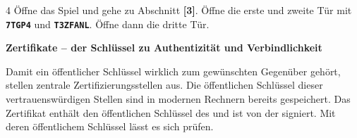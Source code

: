 \documentclass[11pt,a4paper]{article}
\begin{document}
\begin{aufgabe}{4}
Öffne das Spiel und gehe zu Abschnitt \textbf{[3]}. Öffne die erste und zweite Tür mit \texttt{\bfseries 7TGP4} und \texttt{\bfseries T3ZFANL}. Öffne dann die dritte Tür.
\end{aufgabe}

\textbf{Zertifikate – der Schlüssel zu Authentizität und Verbindlichkeit}\par
{\lueckentext Damit ein öffentlicher Schlüssel wirklich zum gewünschten Gegenüber gehört, stellen zentrale Zertifizierungsstellen  aus. Die öffentlichen Schlüssel dieser vertrauenswürdigen Stellen sind in modernen Rechnern bereits gespeichert. Das Zertifikat enthält den öffentlichen Schlüssel des  und ist von der  signiert. Mit deren öffentlichem Schlüssel lässt es sich prüfen.\par}

\vfill
{}
\end{document}
